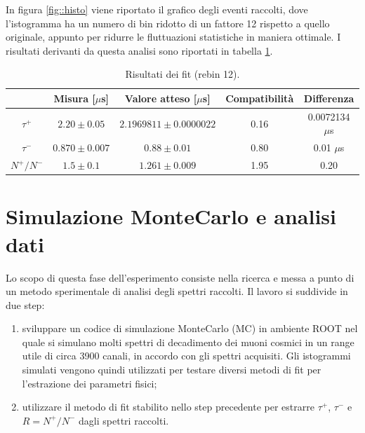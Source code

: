 \documentclass[10pt, oneside, a4paper]{article}   	%
\begin{document}
%
In figura \ref{fig::histo} viene riportato il grafico degli eventi raccolti, dove l'istogramma ha un numero di bin ridotto di un fattore 12 rispetto a quello originale, appunto per ridurre le fluttuazioni statistiche in maniera ottimale. I risultati derivanti da questa analisi sono riportati in tabella \ref{results}.
\begin{table}[h!]
	\centering
	\begin{tabular}{ccccc}
		\toprule
		& Misura [$\mu$s]	&	Valore atteso [$\mu$s]	 & Compatibilità & Differenza 	\\	
		\midrule
		$\tau^+$	&	$2.20\pm 0.05$ & $2.1969811 \pm 0.0000022$ & 0.16 & 0.0072134 $\mu$s	\\
		$\tau^-$	&	$0.870\pm 0.007$ & $0.88 \pm 0.01$ & 0.80 & 0.01 $\mu$s	\\
		$N^+/N^-$	&	$1.5 \pm 0.1$ & $1.261 \pm 0.009$ & 1.95 & 0.20	\\
		\bottomrule
	\end{tabular}
	\caption{Risultati dei fit (rebin 12).}
	\label{results}
\end{table}
\cleardoublepage
\section{Simulazione MonteCarlo e analisi dati}
Lo scopo di questa fase dell'esperimento consiste nella ricerca e messa a punto di un metodo sperimentale di analisi degli spettri raccolti. Il lavoro si suddivide in due step:
\begin{enumerate}
 \item sviluppare un codice di simulazione MonteCarlo (MC) in ambiente ROOT nel quale si simulano molti spettri di decadimento dei muoni cosmici in un range utile di circa 3900 canali, in accordo con gli spettri acquisiti. Gli istogrammi simulati vengono quindi utilizzati per testare diversi metodi di fit per l'estrazione dei parametri fisici;
 \item utilizzare il metodo di fit stabilito nello step precedente per estrarre $\tau^+$, $\tau^-$ e $R=N^+/N^-$ dagli spettri raccolti.
\end{enumerate}
%
\end{document}
